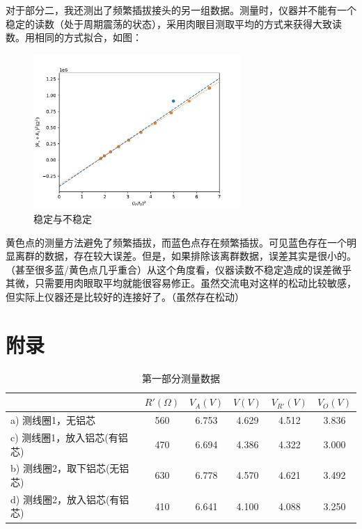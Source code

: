 \documentclass[12pt]{article}
\begin{document}
对于部分二，我还测出了频繁插拔接头的另一组数据。测量时，仪器并不能有一个稳定的读数（处于周期震荡的状态），采用肉眼目测取平均的方式来获得大致读数。用相同的方式拟合，如图：
\begin{figure}[H]
    \centering
    \includegraphics[width=0.7\textwidth]{fig_old.pdf}
    \caption{稳定与不稳定}
    \label{fig:5}
\end{figure}
黄色点的测量方法避免了频繁插拔，而蓝色点存在频繁插拔。可见蓝色存在一个明显离群的数据，存在较大误差。但是，如果排除该离群数据，误差其实是很小的。（甚至很多蓝/黄色点几乎重合）从这个角度看，仪器读数不稳定造成的误差微乎其微，只需要用肉眼取平均就能很容易修正。虽然交流电对这样的松动比较敏感，但实际上仪器还是比较好的连接好了。（虽然存在松动）

\clearpage
\appendix
\section{附录}
\renewcommand{\thetable}{附表\arabic{table}}
\setcounter{table}{0}
\begin{table}[H]
    \centering
    \begin{tabular}{|l|c|c|c|c|c|}
        \hline
                          & $R' (\Omega)$ & $V_A (V)$ & $V (V)$ & $V_{R'} (V)$ & $V_O (V)$ \\ \hline
        a) 测线圈1，无铝芯       & 560    & 6.753  & 4.629 & 4.512   & 3.836  \\ \hline
        c) 测线圈1，放入铝芯(有铝芯) & 470    & 6.694  & 4.386 & 4.322   & 3.000  \\ \hline
        b) 测线圈2，取下铝芯(无铝芯) & 630    & 6.778  & 4.570 & 4.621   & 3.492  \\ \hline
        d) 测线圈2，放入铝芯(有铝芯) & 410    & 6.641  & 4.100 & 4.088   & 3.250  \\ \hline
        \end{tabular}
    \caption{第一部分测量数据}
    \label{tab:A1}
\end{table}
\end{document}
